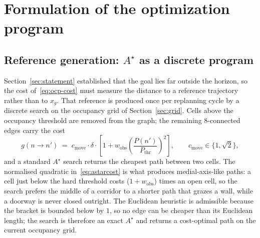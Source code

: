 \documentclass[11pt,a4paper]{article}
\newcommand{\astar}{$A^\star$}
\begin{document}
\section{Formulation of the optimization program}
\label{sec:formulation}

\subsection{Reference generation: \texorpdfstring{\astar{}}{A*} as a discrete program}
\label{sec:astar}

Section~\ref{sec:statement} established that the goal lies far outside the horizon, so the cost
of~\eqref{eq:ocp-cost} must measure the distance to a reference trajectory rather than to $x_g$. That
reference is produced once per replanning cycle by a discrete search on the occupancy grid of
Section~\ref{sec:grid}. Cells above the occupancy threshold are removed from the graph; the remaining
$8$-connected edges carry the cost
\begin{equation}
  g(n\rightarrow n') \;=\; c_{\mathrm{move}}\cdot\delta\cdot
  \left[1+w_{\mathrm{obs}}\left(\frac{P(n')}{P_{\mathrm{thr}}}\right)^{\!2}\right],
  \qquad c_{\mathrm{move}}\in\{1,\sqrt2\},
  \label{eq:astarcost}
\end{equation}
and a standard \astar{} search returns the cheapest path between two cells. The normalised quadratic
in~\eqref{eq:astarcost} is what produces medial-axis-like paths: a cell just below the hard threshold costs
($1+w_{\mathrm{obs}}$) times an open cell, so the search prefers the middle of a corridor to a shorter path
that grazes a wall, while a doorway is never closed outright. The Euclidean heuristic is admissible because
the bracket is bounded below by $1$, so no edge can be cheaper than its Euclidean length; the search is
therefore an exact \astar{} and returns a cost-optimal path on the current occupancy grid.
\end{document}
